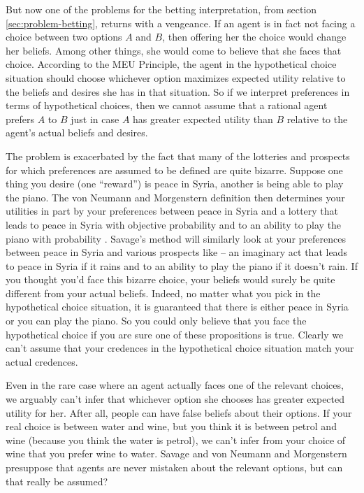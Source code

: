 But now one of the problems for the betting interpretation, from
section \ref{sec:problem-betting}, returns with a vengeance. If an
agent is in fact not facing a choice between two options $A$ and $B$,
then offering her the choice would change her beliefs. Among other
things, she would come to believe that she faces that
choice. According to the MEU Principle, the agent in the hypothetical
choice situation should choose whichever option maximizes expected
utility relative to the beliefs and desires she has in that
situation. So if we interpret preferences in terms of hypothetical
choices, then we cannot assume that a rational agent prefers $A$ to
$B$ just in case $A$ has greater expected utility than $B$ relative to
the agent's actual beliefs and desires.


The problem is exacerbated by the fact that many of the lotteries and
prospects for which preferences are assumed to be defined are quite
bizarre. Suppose one thing you desire (one ``reward'') is peace in
Syria, another is being able to play the piano. The von Neumann and
Morgenstern definition then determines your utilities in part by your
preferences between peace in Syria and a lottery that leads to peace
in Syria with objective probability  and to an ability
to play the piano with probability . Savage's method
will similarly look at your preferences between peace in Syria and
various prospects like 
-- an imaginary act that leads to peace in Syria if it rains and to an
ability to play the piano if it doesn't rain. If you thought you'd
face this bizarre choice, your beliefs would surely be quite different
from your actual beliefs. Indeed, no matter what you pick in the
hypothetical choice situation, it is guaranteed that there is either
peace in Syria or you can play the piano. So you could only believe
that you face the hypothetical choice if you are sure one of these
propositions is true. Clearly we can't assume that your credences in
the hypothetical choice situation match your actual credences.

Even in the rare case where an agent actually faces one of the
relevant choices, we arguably can't infer that whichever option she
chooses has greater expected utility for her. After all, people can
have false beliefs about their options. If your real choice is between
water and wine, but you think it is between petrol and wine (because
you think the water is petrol), we can't infer from your choice of
wine that you prefer wine to water. Savage and von Neumann and
Morgenstern presuppose that agents are never mistaken about the
relevant options, but can that really be assumed?

